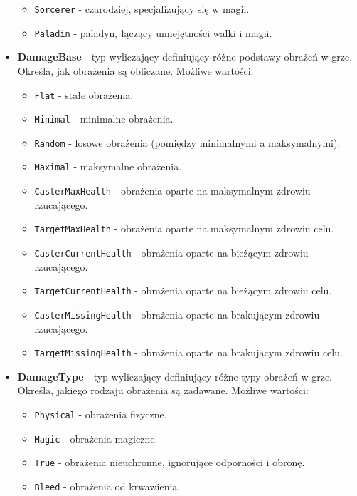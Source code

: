 \begin{itemize}
\begin{itemize}
                \item \texttt{Sorcerer} - czarodziej, specjalizujący się w magii.
                \item \texttt{Paladin} - paladyn, łączący umiejętności walki i magii.
            \end{itemize}
        \item \textbf{DamageBase} - typ wyliczający definiujący różne podstawy obrażeń w grze. 
        Określa, jak obrażenia są obliczane. Możliwe wartości:
            \begin{itemize}
                \item \texttt{Flat} - stałe obrażenia.
                \item \texttt{Minimal} - minimalne obrażenia.
                \item \texttt{Random} - losowe obrażenia (pomiędzy minimalnymi a maksymalnymi).
                \item \texttt{Maximal} - maksymalne obrażenia.
                \item \texttt{CasterMaxHealth} - obrażenia oparte na maksymalnym zdrowiu rzucającego.
                \item \texttt{TargetMaxHealth} - obrażenia oparte na maksymalnym zdrowiu celu.
                \item \texttt{CasterCurrentHealth} - obrażenia oparte na bieżącym zdrowiu rzucającego.
                \item \texttt{TargetCurrentHealth} - obrażenia oparte na bieżącym zdrowiu celu.
                \item \texttt{CasterMissingHealth} - obrażenia oparte na brakującym zdrowiu rzucającego.
                \item \texttt{TargetMissingHealth} - obrażenia oparte na brakującym zdrowiu celu.
            \end{itemize}
        \item \textbf{DamageType} - typ wyliczający definiujący różne typy obrażeń w grze. 
        Określa, jakiego rodzaju obrażenia są zadawane. Możliwe wartości:
            \begin{itemize}
                \item \texttt{Physical} - obrażenia fizyczne.
                \item \texttt{Magic} - obrażenia magiczne.
                \item \texttt{True} - obrażenia nieuchronne, ignorujące odporności i obronę.
                \item \texttt{Bleed} - obrażenia od krwawienia.

\end{itemize}
\end{itemize}
